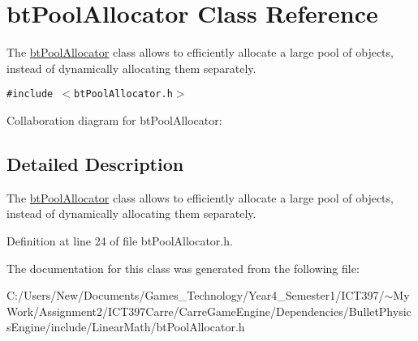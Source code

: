 \hypertarget{classbt_pool_allocator}{
\section{btPoolAllocator Class Reference}
\label{classbt_pool_allocator}
}
The \hyperlink{classbt_pool_allocator}{btPoolAllocator} class allows to efficiently allocate a large pool of objects, instead of dynamically allocating them separately.  


{\tt \#include $<$btPoolAllocator.h$>$}

Collaboration diagram for btPoolAllocator:

\subsection{Detailed Description}
The \hyperlink{classbt_pool_allocator}{btPoolAllocator} class allows to efficiently allocate a large pool of objects, instead of dynamically allocating them separately. 

Definition at line 24 of file btPoolAllocator.h.

The documentation for this class was generated from the following file:\begin{CompactItemize}
\item 
C:/Users/New/Documents/Games\_\-Technology/Year4\_\-Semester1/ICT397/$\sim$My Work/Assignment2/ICT397Carre/CarreGameEngine/Dependencies/BulletPhysicsEngine/include/LinearMath/btPoolAllocator.h\end{CompactItemize}
